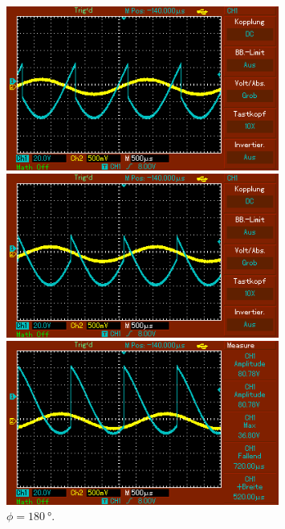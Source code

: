 \begin{figure}
\begin{minipage}{0.5\textwidth}
        \caption{$\phi = \SI{90}{\degree}$.} 
        \label{fig:13}
    \end{minipage}
    \hfill
    \begin{minipage}{0.5\textwidth}
        \centering
        \includegraphics[width=0.8\textwidth]{bilder/135ohne.png}
        \caption{$\phi = \SI{135}{\degree}$.} 
        \label{fig:14}
    \end{minipage}
    \vspace{1cm}
    \vfill
    \begin{minipage}{0.5\textwidth}
        \centering
        \includegraphics[width=0.8\textwidth]{bilder/180ohne.png}
        \caption{$\phi = \SI{180}{\degree}$.} 
        \label{fig:15}
    \end{minipage}
    \hfill
    \begin{minipage}{0.5\textwidth}
        \centering
        \includegraphics[width=0.8\textwidth]{bilder/240ohne.png}

\end{minipage}
\end{figure}
